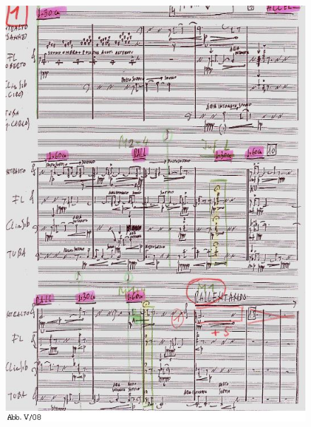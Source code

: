 \begin{figure}[htbp]
\begin{center}
\includegraphics[width=1\textwidth]{images/nono/hph/ab_v_08.jpg}
\caption{}
\label{hph-img8}
\end{center}
\end{figure}


